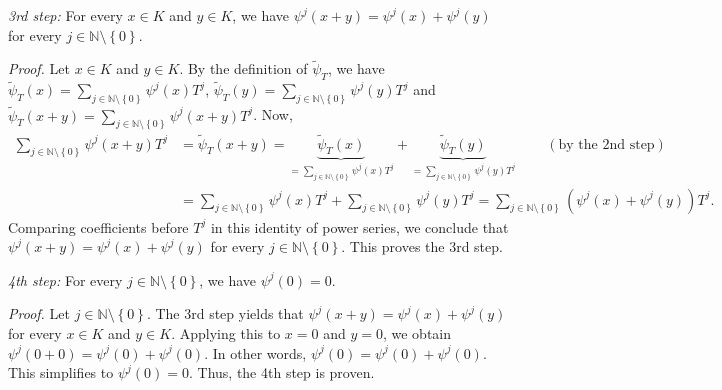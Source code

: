 \documentclass[numbers=enddot,12pt,final,onecolumn,notitlepage]{scrartcl}%
\begin{document}
\textit{3rd step:} For every $x\in K$ and $y\in K$, we have $\psi^{j}\left(
x+y\right)  =\psi^{j}\left(  x\right)  +\psi^{j}\left(  y\right)  $ for every
$j\in\mathbb{N}\setminus\left\{  0\right\}  $.

\textit{Proof.} Let $x\in K$ and $y\in K$. By the definition of
$\widetilde{\psi}_{T}$, we have $\widetilde{\psi}_{T}\left(  x\right)
=\sum\limits_{j\in\mathbb{N}\setminus\left\{  0\right\}  }\psi^{j}\left(
x\right)  T^{j}$, $\widetilde{\psi}_{T}\left(  y\right)  =\sum\limits_{j\in
\mathbb{N}\setminus\left\{  0\right\}  }\psi^{j}\left(  y\right)  T^{j}$ and
$\widetilde{\psi}_{T}\left(  x+y\right)  =\sum\limits_{j\in\mathbb{N}%
\setminus\left\{  0\right\}  }\psi^{j}\left(  x+y\right)  T^{j}$. Now,%
\begin{align*}
\sum\limits_{j\in\mathbb{N}\setminus\left\{  0\right\}  }\psi^{j}\left(
x+y\right)  T^{j}  &  =\widetilde{\psi}_{T}\left(  x+y\right)
=\underbrace{\widetilde{\psi}_{T}\left(  x\right)  }_{=\sum\limits_{j\in
\mathbb{N}\setminus\left\{  0\right\}  }\psi^{j}\left(  x\right)  T^{j}%
}+\underbrace{\widetilde{\psi}_{T}\left(  y\right)  }_{=\sum\limits_{j\in
\mathbb{N}\setminus\left\{  0\right\}  }\psi^{j}\left(  y\right)  T^{j}%
}\ \ \ \ \ \ \ \ \ \ \left(  \text{by the 2nd step}\right) \\
&  =\sum\limits_{j\in\mathbb{N}\setminus\left\{  0\right\}  }\psi^{j}\left(
x\right)  T^{j}+\sum\limits_{j\in\mathbb{N}\setminus\left\{  0\right\}  }%
\psi^{j}\left(  y\right)  T^{j}=\sum\limits_{j\in\mathbb{N}\setminus\left\{
0\right\}  }\left(  \psi^{j}\left(  x\right)  +\psi^{j}\left(  y\right)
\right)  T^{j}.
\end{align*}
Comparing coefficients before $T^{j}$ in this identity of power series, we
conclude that $\psi^{j}\left(  x+y\right)  =\psi^{j}\left(  x\right)
+\psi^{j}\left(  y\right)  $ for every $j\in\mathbb{N}\setminus\left\{
0\right\}  $. This proves the 3rd step.

\textit{4th step:} For every $j\in\mathbb{N}\setminus\left\{  0\right\}  $, we
have $\psi^{j}\left(  0\right)  =0$.

\textit{Proof.} Let $j\in\mathbb{N}\setminus\left\{  0\right\}  $. The 3rd
step yields that $\psi^{j}\left(  x+y\right)  =\psi^{j}\left(  x\right)
+\psi^{j}\left(  y\right)  $ for every $x\in K$ and $y\in K$. Applying this to
$x=0$ and $y=0$, we obtain $\psi^{j}\left(  0+0\right)  =\psi^{j}\left(
0\right)  +\psi^{j}\left(  0\right)  $. In other words, $\psi^{j}\left(
0\right)  =\psi^{j}\left(  0\right)  +\psi^{j}\left(  0\right)  $. This
simplifies to $\psi^{j}\left(  0\right)  =0$. Thus, the 4th step is proven.
\end{document}
